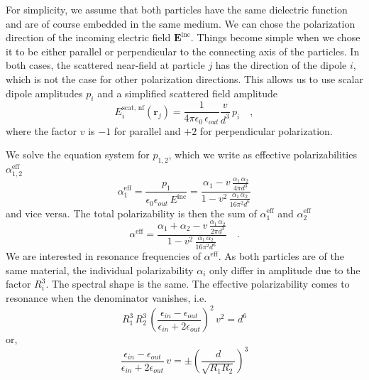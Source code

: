 For simplicity, we assume that both particles have the same dielectric function and are of course embedded in the same medium. 
We  can chose the polarization direction of the incoming electric field  $\mathbf{E}^{\text{inc}}$. Things become simple when we chose it to be either parallel or perpendicular to the connecting axis of the particles. In both cases, the scattered near-field at particle $j$ has the direction of the dipole $i$, which is not the case for other polarization directions. This allows us to use scalar dipole amplitudes $p_i$ and a simplified scattered field amplitude
\begin{equation}
  {E}^{\text{scat, nf}}_i(\mathbf{r}_j) = \frac{ 1 }{4\pi\epsilon_0 \, \epsilon_{out}}  \frac{v}{d^3} \, p_i 
  \quad ,
\end{equation}
where the factor $v$ is $-1$ for parallel and $+2$ for perpendicular polarization.

We solve the equation system for $p_{1,2}$, which we write as effective polarizabilities $\alpha^\text{eff}_{1,2}$
\begin{equation}
 \alpha^\text{eff}_1 = \frac{p_1}{\epsilon_0 \epsilon_{out} \, E^\text{inc}} =  \frac{\alpha_1 - v \, \frac{\alpha_1 \, \alpha_2}{4 \pi d^3}}
 {1- v^2 \, \frac{\alpha_1 \, \alpha_2 }{16 \pi^2 d^6}} 
\end{equation}
and vice versa.
The total polarizability  is then the sum of $\alpha^\text{eff}_{1}$ and $\alpha^\text{eff}_{2}$
\begin{equation}
 \alpha^\text{eff} = \frac{\alpha_1  + \alpha_2 - v \, \frac{\alpha_1 \, \alpha_2}{2 \pi d^3}}
 {1- v^2 \, \frac{\alpha_1 \, \alpha_2 }{16 \pi^2 d^6}} \quad .
 \label{eq:hybrid_alpha_eff}
\end{equation}
We are interested in resonance frequencies of $\alpha^\text{eff} $. As both particles are of the same material, the individual polarizability $\alpha_i$ only differ in amplitude due to the factor $R_i^3$. The spectral shape is the same. The effective polarizability comes to resonance when the denominator vanishes, i.e.
\begin{equation}
R_1^3 \, R_2^3 \, \left( \frac{\epsilon_{in} - \epsilon_{out}} {\epsilon_{in} + 2 \epsilon_{out}} \right)^2 \, v^2 = d^6
\label{eq:hybrid_res_cond}
\end{equation}
or,
\begin{equation}
 \frac{\epsilon_{in} - \epsilon_{out}} {\epsilon_{in} + 2 \epsilon_{out}} \, v = \pm \left( \frac{d}{\sqrt{R_1 R_2}} \right)^3
\end{equation}

